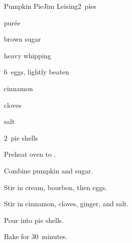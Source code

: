 \begin{recipe}{Pumpkin Pie}{Jim Leising}{2~pies}

\begin{ingredients}
\item \C{1\threequarter}  pur\'ee
\item {} brown sugar
\item \C{1\half} heavy whipping 
\item \C{\half} 
\item 6~eggs, lightly beaten
\item {} cinnamon
\item \tp{\half} cloves
\item \tp{1\half} 
\item \tp{\quarter} salt
\item 2~pie shells
\end{ingredients}

\begin{directions}
\item Preheat oven to .
\item Combine pumpkin and sugar.
\item Stir in cream, bourbon, then eggs.
\item Stir in cinnamon, cloves, ginger, and salt.
\item Pour into pie shells.
\item Bake for 30~minutes.
\end{directions}

\end{recipe}
